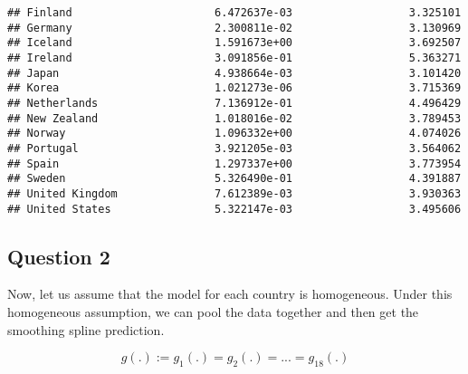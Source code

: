 \documentclass[
]{article}
\begin{document}
\begin{verbatim}
## Finland                      6.472637e-03                  3.325101
## Germany                      2.300811e-02                  3.130969
## Iceland                      1.591673e+00                  3.692507
## Ireland                      3.091856e-01                  5.363271
## Japan                        4.938664e-03                  3.101420
## Korea                        1.021273e-06                  3.715369
## Netherlands                  7.136912e-01                  4.496429
## New Zealand                  1.018016e-02                  3.789453
## Norway                       1.096332e+00                  4.074026
## Portugal                     3.921205e-03                  3.564062
## Spain                        1.297337e+00                  3.773954
## Sweden                       5.326490e-01                  4.391887
## United Kingdom               7.612389e-03                  3.930363
## United States                5.322147e-03                  3.495606
\end{verbatim}

\hypertarget{question-2}{%
\subsection{Question 2}\label{question-2}}

Now, let us assume that the model for each country is homogeneous. Under
this homogeneous assumption, we can pool the data together and then get
the smoothing spline prediction.

\[
g(.) := g_1(.) = g_2(.)= ... = g_{18}(.) 
\]
\end{document}
